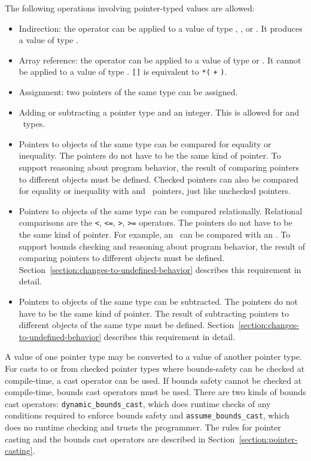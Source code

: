 The following operations involving pointer-typed values are allowed:

\begin{itemize}
\item
  Indirection: the \code{*} operator can be applied to a value of type
   \code{*}, \ptrT, or \arrayptrT. It produces a value of type .
\item
  Array reference: the \code{[]} operator can be applied to a
  value of type  \code{*} or \arrayptrT. It
  cannot be applied to a value of type \ptrT.
  \lstinline|[|\lstinline|]| is equivalent to
  \lstinline|*(| \lstinline|+| \lstinline|)|.
\item
  Assignment: two pointers of the same type can be assigned.
\item
  Adding or subtracting a pointer type and an integer. This is allowed
  for  \code{*} and \arrayptrT\ types.
\item
  Pointers to objects of the same type can be compared for equality or
  inequality. The pointers do not have to be the same kind of pointer.
  To support reasoning about program behavior, the result of comparing
  pointers to different objects must be defined.  Checked pointers can also
  be compared for equality or inequality with  and \void\ pointers,
  just like unchecked pointers.
\item
  Pointers to objects of the same type can be compared relationally. Relational comparisons are the
  \lstinline|<|, \lstinline|<=|, \lstinline|>|, \lstinline|>=| operators. The pointers do not have
  to be
  the same kind of pointer. For example, an \uncheckedptrT\ can be compared with an
  \arrayptrT . To support bounds checking and reasoning about program behavior, the
  result of comparing pointers to different objects must be defined.
  Section~\ref{section:changes-to-undefined-behavior} describes this requirement in detail.
\item
  Pointers to objects of the same type can be subtracted. The pointers do not have to be
  the same kind of
  pointer. The result of subtracting pointers to different objects of
  the same type must be defined. Section~\ref{section:changes-to-undefined-behavior}
  describes this requirement in detail.
\end{itemize}

A value of one pointer type may be converted to a value of another
pointer type. For casts to or from checked pointer types where
bounds-safety can be checked at compile-time, a cast operator can be
used. If bounds safety cannot be checked at compile-time, bounds cast
operators must be used. There are two kinds of bounds cast operators:
\lstinline+dynamic_bounds_cast+, which does runtime checks of any
conditions required to enforce bounds safety and
\lstinline+assume_bounds_cast+, which does no runtime checking and
trusts the programmer. The rules for pointer casting and the bounds cast
operators are described in Section~\ref{section:pointer-casting}.

